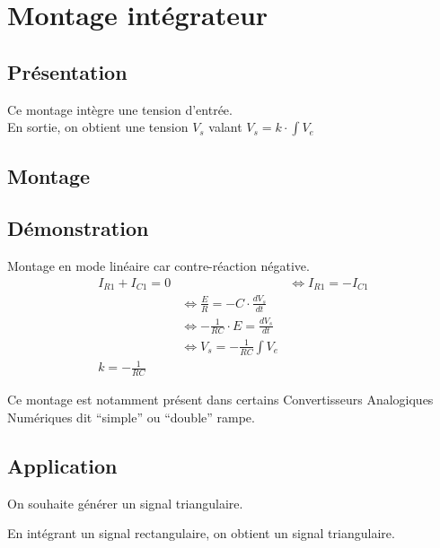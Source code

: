 



\chapter{Montage intégrateur}
\section{Présentation}
Ce montage intègre une tension d’entrée. \\
En sortie, on obtient une tension $V_s$ valant $V_s=k \cdot \int V_e$

\section{Montage}


\section{Démonstration}

Montage en mode linéaire car contre-réaction négative. \\


\begin{align}
I_{R1} + I_{C1}  = 0 & 
& \Leftrightarrow I_{R1} = -I_{C1} \\
& \Leftrightarrow \frac{E}{R} = - C \cdot \frac{dV_s}{dt} \\
& \Leftrightarrow -\frac{1}{RC}\cdot E = \frac{dV_s}{dt} \\
& \Leftrightarrow V_s = -\frac{1}{RC} \int V_e \\
k=-\frac{1}{RC} &
\end{align}
   
Ce montage est notamment présent dans certains Convertisseurs Analogiques Numériques dit “simple” ou “double” rampe. 


\section{Application}

\begin{exemple}
On souhaite générer un signal triangulaire.
\end{exemple}


En intégrant un signal rectangulaire, on obtient un signal triangulaire.




